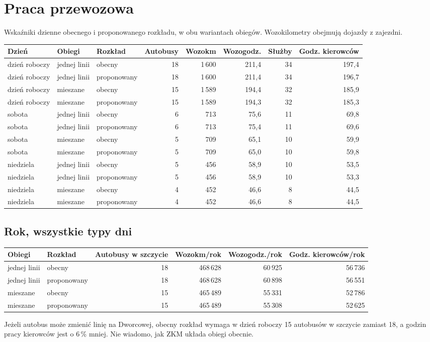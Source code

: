 \documentclass[10pt,a4paper]{article}
\begin{document}
\section{Praca przewozowa}
Wskaźniki dzienne obecnego i proponowanego rozkładu, w obu wariantach obiegów. Wozokilometry obejmują dojazdy z zajezdni.
{\footnotesize
\begin{center}\begin{tabular}{@{}l l l r r r r r@{}}\toprule
Dzień & Obiegi & Rozkład & Autobusy & Wozokm & Wozogodz. & Służby & Godz. kierowców \\ \midrule
dzień roboczy & jednej linii & obecny & 18 & 1\,600 & 211,4 & 34 & 197,4 \\
dzień roboczy & jednej linii & proponowany & 18 & 1\,600 & 211,4 & 34 & 196,7 \\
dzień roboczy & mieszane & obecny & 15 & 1\,589 & 194,4 & 32 & 185,9 \\
dzień roboczy & mieszane & proponowany & 15 & 1\,589 & 194,3 & 32 & 185,3 \\
sobota & jednej linii & obecny & 6 & 713 & 75,6 & 11 & 69,8 \\
sobota & jednej linii & proponowany & 6 & 713 & 75,4 & 11 & 69,6 \\
sobota & mieszane & obecny & 5 & 709 & 65,1 & 10 & 59,9 \\
sobota & mieszane & proponowany & 5 & 709 & 65,0 & 10 & 59,8 \\
niedziela & jednej linii & obecny & 5 & 456 & 58,9 & 10 & 53,5 \\
niedziela & jednej linii & proponowany & 5 & 456 & 58,9 & 10 & 53,3 \\
niedziela & mieszane & obecny & 4 & 452 & 46,6 & 8 & 44,5 \\
niedziela & mieszane & proponowany & 4 & 452 & 46,6 & 8 & 44,5 \\
\bottomrule\end{tabular}\end{center}}
\subsection*{Rok, wszystkie typy dni}
{\small
\begin{center}\begin{tabular}{@{}l l r r r r@{}}\toprule
Obiegi & Rozkład & Autobusy w szczycie & Wozokm/rok & Wozogodz./rok & Godz. kierowców/rok \\ \midrule
jednej linii & obecny & 18 & 468\,628 & 60\,925 & 56\,736 \\
jednej linii & proponowany & 18 & 468\,628 & 60\,898 & 56\,551 \\
mieszane & obecny & 15 & 465\,489 & 55\,331 & 52\,786 \\
mieszane & proponowany & 15 & 465\,489 & 55\,308 & 52\,625 \\
\bottomrule\end{tabular}\end{center}}
Jeżeli autobus może zmienić linię na Dworcowej, obecny rozkład wymaga w dzień roboczy 15 autobusów w szczycie zamiast 18, a godzin pracy kierowców jest o 6\,\% mniej. Nie wiadomo, jak ZKM układa obiegi obecnie.
\end{document}
